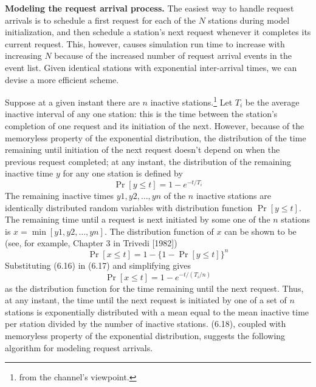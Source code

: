 \noindent\textbf{Modeling the request arrival process.} The easiest way to handle request arrivals is to schedule a first request for each of the $N$ stations during model initialization, and then schedule a station's next request whenever it completes its current request. This, however, causes simulation run time to increase with increasing $N$ because of the increased number of request arrival events in the event list. Given identical stations with exponential inter-arrival times, we can devise a more efficient scheme.

Suppose at a given instant there are $n$ inactive stations.\footnote{from the channel's viewpoint.} Let $T_i$ be the average inactive interval of any one station: this is the time between the station's completion of one request and its initiation of the next. However, because of the memoryless property of the exponential distribution, the distribution of the time remaining until initiation of the next request doesn't depend on when the previous request completed; at any instant, the distribution of the remaining inactive time $y$ for any one station is defined by
\begin{equation} \Pr[y\le t]=1-e^{-t/T_i} \end{equation}
The remaining inactive times $y1,y2,\ldots,yn$ of the $n$ inactive stations are identically distributed random variables with distribution function $\Pr[y\le t]$. The remaining time until a request is next initiated by some one of the $n$ stations is $x=\min[y1,y2,\ldots,yn]$. The distribution function of $x$ can be shown to be (see, for example, Chapter 3 in Trivedi [1982])
\begin{equation} \Pr[x\le t]=1-\{1-\Pr[y\le t]\}^n \end{equation}
Substituting (6.16) in (6.17) and simplifying gives
\begin{equation} \Pr[x\le t]=1-e^{-t/(T_i/n)} \end{equation}
as the distribution function for the time remaining until the next request. Thus, at any instant, the time until the next request is initiated by one of a set of $n$ stations is exponentially distributed with a mean equal to the mean inactive time per station divided by the number of inactive stations. (6.18), coupled with memoryless property of the exponential distribution, suggests the following algorithm for modeling request arrivals.

